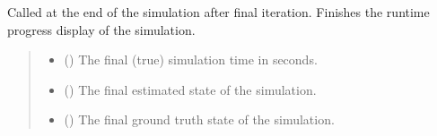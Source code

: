 \documentclass[letterpaper,10pt,english]{sphinxmanual}
\begin{document}
\begin{fulllineitems}
\begin{fulllineitems}
\label{\detokenize{modules/simulation/display:qnav.simulation.display.MultilineDisplay.on_finish}}
\pysigstartsignatures
{}
\pysigstopsignatures
\sphinxAtStartPar
Called at the end of the simulation after final iteration.
Finishes the runtime progress display of the simulation.
\begin{quote}\begin{description}
\begin{itemize}
\item {} 
\sphinxAtStartPar
{} () \textendash{} The final (true) simulation time in seconds.

\item {} 
\sphinxAtStartPar
{} ({\hyperref[\detokenize{modules/estimation/state:qnav.estimation.state.EstimatedState}]{}}) \textendash{} The final estimated state of the simulation.

\item {} 
\sphinxAtStartPar
{} ({\hyperref[\detokenize{modules/waypoints/trajectory:qnav.waypoints.trajectory.GroundTruth}]{}}) \textendash{} The final ground truth state of the simulation.

\end{itemize}

\end{description}\end{quote}

\end{fulllineitems}


\end{fulllineitems}
\end{document}
